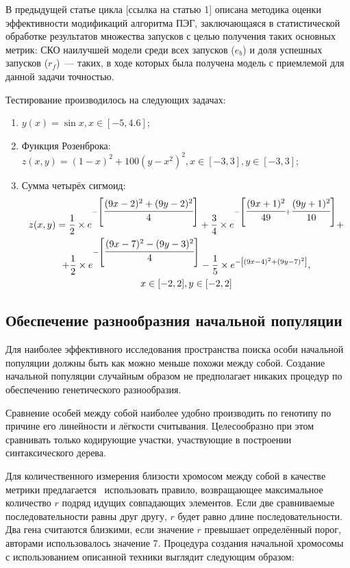 В предыдущей статье цикла [ссылка на статью 1] описана методика оценки эффективности модификаций алгоритма ПЭГ, заключающаяся в статистической обработке результатов множества запусков с целью получения таких основных метрик: СКО наилучшей модели среди всех запусков ($e_{b}$) и доля успешных запусков ($r_{f}$)~--- таких, в ходе которых была получена модель с приемлемой для данной задачи точностью.

Тестирование производилось на следующих задачах:
\begin{enumerate}
  \item $y(x) = \sin x, x \in [-5, 4.6]$;
  \item Функция Розенброка: $z(x, y) = {(1 - x)}^2 + 100 {(y - x^2)}^2, x \in [-3, 3], y \in [-3, 3]$;
  \item Сумма четырёх сигмоид:
    \begin{multline}
      z(x, y) = \frac{1}{2} \times e^{-\left\lbrack\cfrac{(9x-2)^2 + (9y-2)^2}{4}\right\rbrack} + \frac{3}{4} \times e^{-\left\lbrack\cfrac{(9x+1)^2}{49} + \cfrac{(9y+1)^2}{10}\right\rbrack} + \\
      + \frac{1}{2} \times e^{-\left\lbrack\cfrac{(9x-7)^2 - (9y-3)^2}{4}\right\rbrack} -\frac{1}{5} \times e^{-\left\lbrack(9x-4)^2 + (9y-7)^2\right\rbrack}, \\
      x \in [-2, 2], y \in [-2, 2]
    \end{multline}
\end{enumerate}






\subsection{Обеспечение разнообразния начальной популяции}

Для наиболее эффективного исследования пространства поиска особи начальной популяции должны быть как можно меньше похожи между собой. Создание начальной популяции случайным образом не предполагает никаких процедур по обеспечению генетического разнообразия.

Сравнение особей между собой наиболее удобно производить по генотипу по причине его линейности и лёгкости считывания. Целесообразно при этом сравнивать только кодирующие участки, участвующие в построении синтаксического дерева.

Для количественного измерения близости хромосом между собой в качестве метрики предлагается~\cite{Duan:2007:SID:1304604.1305918} использовать правило, возвращающее максимальное количество $r$ подряд идущих совпадающих элементов. Если две сравниваемые последовательности равны друг другу, $r$ будет равно длине последовательности. Два гена считаются близкими, если значение $r$ превышает определённый порог, авторами использовалось значение 7.
Процедура создания начальной хромосомы с использованием описанной техники выглядит следующим образом:

